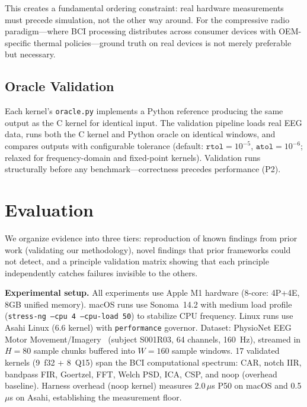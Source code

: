 \documentclass[sigplan,10pt]{acmart}
\begin{document}
This creates a fundamental ordering constraint: real hardware measurements must precede simulation, not the other way around. For the compressive radio paradigm---where BCI processing distributes across consumer devices with OEM-specific thermal policies---ground truth on real devices is not merely preferable but necessary.

\subsection{Oracle Validation}

Each kernel's \texttt{oracle.py} implements a Python reference producing the same output as the C kernel for identical input. The validation pipeline loads real EEG data, runs both the C kernel and Python oracle on identical windows, and compares outputs with configurable tolerance (default: $\texttt{rtol}=10^{-5}$, $\texttt{atol}=10^{-6}$; relaxed for frequency-domain and fixed-point kernels). Validation runs structurally before any benchmark---correctness precedes performance (P2).


\section{Evaluation}
\label{sec:eval}

We organize evidence into three tiers: reproduction of known findings from prior work (validating our methodology), novel findings that prior frameworks could not detect, and a principle validation matrix showing that each principle independently catches failures invisible to the others.

\textbf{Experimental setup.} All experiments use Apple M1 hardware (8-core: 4P+4E, 8GB unified memory). macOS runs use Sonoma~14.2 with medium load profile (\texttt{stress-ng --cpu 4 --cpu-load 50}) to stabilize CPU frequency. Linux runs use Asahi Linux (6.6 kernel) with \texttt{performance} governor. Dataset: PhysioNet EEG Motor Movement/Imagery~\cite{goldberger2000physionet} (subject S001R03, 64 channels, 160~Hz), streamed in $H=80$ sample chunks buffered into $W=160$ sample windows. 17 validated kernels (9~f32 + 8~Q15) span the BCI computational spectrum: CAR, notch IIR, bandpass FIR, Goertzel, FFT, Welch PSD, ICA, CSP, and noop (overhead baseline). Harness overhead (noop kernel) measures 2.0\,$\mu$s P50 on macOS and 0.5\,$\mu$s on Asahi, establishing the measurement floor.
\end{document}
